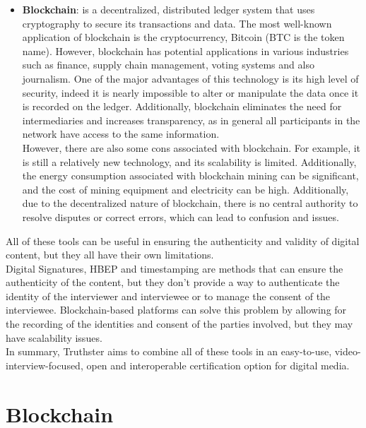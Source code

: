 \documentclass[target=mst,aauheader=]{thud}
\begin{document}
\begin{itemize}
    \item \textbf{Blockchain}: is a decentralized, distributed ledger system that uses cryptography to secure its transactions and data. The most well-known application of blockchain is the cryptocurrency, Bitcoin (BTC is the token name). However, blockchain has potential applications in various industries such as finance, supply chain management, voting systems and also journalism. One of the major advantages of this technology is its high level of security, indeed it is nearly impossible to alter or manipulate the data once it is recorded on the ledger. Additionally, blockchain eliminates the need for intermediaries and increases transparency, as in general all participants in the network have access to the same information.\\However, there are also some cons associated with blockchain. For example, it is still a relatively new technology, and its scalability is limited. Additionally, the energy consumption associated with blockchain mining can be significant, and the cost of mining equipment and electricity can be high. Additionally, due to the decentralized nature of blockchain, there is no central authority to resolve disputes or correct errors, which can lead to confusion and issues.

\end{itemize}

All of these tools can be useful in ensuring the authenticity and validity of digital content, but they all have their own limitations.\\
Digital Signatures, HBEP and timestamping are methods that can ensure the authenticity of the content, but they don't provide a way to authenticate the identity of the interviewer and interviewee or to manage the consent of the interviewee. Blockchain-based platforms can solve this problem by allowing for the recording of the identities and consent of the parties involved, but they may have scalability issues.\\

In summary, Truthster aims to combine all of these tools in an easy-to-use, video-interview-focused, open and interoperable certification option for digital media.


\chapter{Blockchain}
\end{document}
